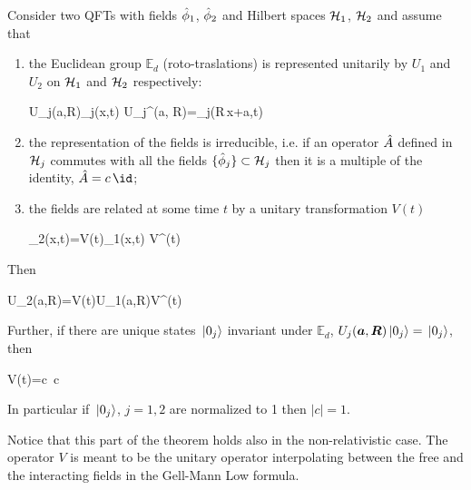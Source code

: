 \documentclass[../main/main.tex]{subfiles}
\begin{document}
\begin{theorem}\label{thm:HHW1}
	Consider two QFTs with fields $\hat{\phi}_1$, $\hat{\phi}_2$ and Hilbert spaces $\mathcal H_1$, $\mathcal H_2$ and assume that
	\begin{enumerate}[label=(\roman*)]
	\item the Euclidean group $\mathbb E_d$ (roto-traslations) is represented unitarily by $U_1$ and $U_2$ on $\mathcal H_1$ and $\mathcal H_2$ respectively:
	\begin{eq}
		U_j(\vec a,\vec R)\ophi_j(\vec x,t) U_j^\dagger(\vec a, \vec R)=\ophi_j(\vec R\,\vec x+\vec a,t)
	\end{eq}
	\item the representation of the fields is irreducible, i.e. if an operator $\hat{A}$ defined in $\mathcal H_j$ commutes with all the fields $\{\hat{\phi}_j\}\subset\mathcal H_j$ then it is a multiple of the identity, $\op A=c\,\id$;
	\item the fields are related at some time $t$ by a unitary transformation $V(t)$
	\begin{eq}
		\ophi_2(\vec x,t)=V(t)\ophi_1(\vec x,t) V^\dagger(t)
	\end{eq}
	\end{enumerate}
	Then 
	\begin{eq}\label{eq:HHW1_thesis1}
		U_2(\vec a,\vec R)=V(t)U_1(\vec a,\vec R)V^\dagger(t)
	\end{eq}
	Further, if there are unique states $\,\vert0_j\rangle$ invariant under $\mathbb E_d$, $U_j(\boldsymbol a,\boldsymbol R)\,\vert0_j\rangle=\,\vert0_j\rangle$, then
	\begin{eq}\label{eq:HHW1_thesis2}
		V(t)=c\, \twith c\in\C
	\end{eq}
	In particular if $\,\vert0_j\rangle$, $j=1,2$ are normalized to 1 then $|c|=1$.
\end{theorem}

Notice that this part of the theorem holds also in the non-relativistic case. The operator $V$ is meant to be the unitary operator interpolating between the free and the interacting fields in the Gell-Mann Low formula.
\end{document}
